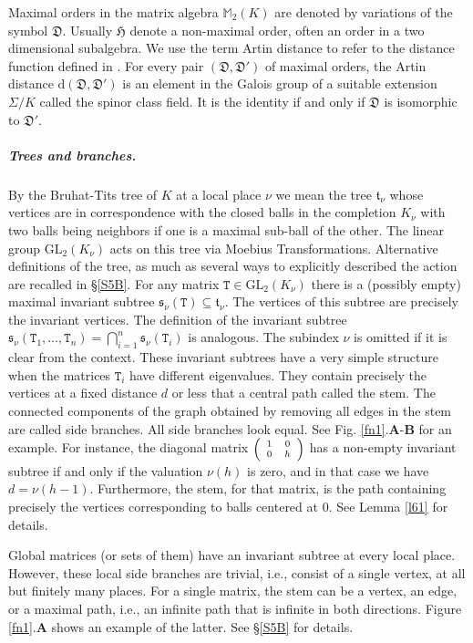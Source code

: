 \documentclass{article}
\theoremstyle{definition}
\theoremstyle{remark}
\newcommand\sbmattrix[4]{\textnormal{\scriptsize$\left(\begin{array}{cc}#1&#2\\#3&#4\end{array}\right)$\normalsize}}
\begin{document}
Maximal orders in the matrix algebra $\mathbb{M}_2(K)$ 
are denoted by variations of the symbol
$\mathfrak{D}$. Usually $\mathfrak{H}$ denote a non-maximal
order, often an order in a two dimensional subalgebra.
We use the term Artin distance to refer to the distance function defined in \cite[\S1]{A13}. For every pair 
$(\mathfrak{D},\mathfrak{D}')$ of maximal orders,
the Artin distance $\mathrm{d}(\mathfrak{D},\mathfrak{D}')$ 
is an element in the Galois group of a suitable extension $\Sigma/K$ called the spinor class field. It is the identity
if and only if $\mathfrak{D}$ is isomorphic to $\mathfrak{D}'$.

\subparagraph{Trees and branches.}

By the Bruhat-Tits tree of $K$ at a local place $\nu$ we 
mean the
tree $\mathfrak{t}_\nu$ whose vertices are in 
correspondence with
the closed balls in the completion $K_\nu$ with two balls 
being neighbors if one is a maximal sub-ball of the other. The 
linear group  $\mathrm{GL}_2(K_\nu)$ acts on this 
tree via Moebius
Transformations. Alternative definitions of the tree,
as much as several ways to explicitly described the action
are recalled in \S\ref{S5B}. For any matrix $\mathtt{T}\in
\mathrm{GL}_2(K_\nu)$ there is a (possibly empty) maximal
invariant subtree 
$\mathfrak{s}_\nu(\mathtt{T})\subseteq\mathfrak{t}_\nu$.
The vertices of this subtree are precisely the 
invariant vertices.
The definition of the invariant subtree 
$\mathfrak{s}_\nu(\mathtt{T}_1,\dots,\mathtt{T}_n)=
\bigcap_{i=1}^n\mathfrak{s}_\nu(\mathtt{T}_i)$ is analogous. 
The subindex $\nu$ is omitted if it is clear from the context. 
These invariant subtrees have a very simple structure 
when the matrices $\mathtt{T}_i$ have different eigenvalues. 
They contain
precisely the vertices at a fixed distance $d$ or 
less that a central 
path called the stem. The connected 
components of the graph obtained 
by removing all edges in the stem are called side branches. All side branches look equal.
See Fig. \ref{fn1}.\textbf{A}-\textbf{B} for an example.
For instance, the diagonal matrix $\sbmattrix100h$
has a non-empty invariant subtree if and only if the valuation 
$\nu(h)$ is zero, and in that case we have $d=\nu(h-1)$.
Furthermore, the stem, for that matrix, is the path containing
precisely the vertices corresponding to balls centered at $0$.
See Lemma \ref{l61} for details.

Global matrices (or sets of them) have an invariant subtree
at every local place. However, these local side branches 
are trivial, i.e.,
consist of a single vertex, at all but finitely many places.
For a single matrix, the stem can be a vertex, an edge,
or a maximal path, i.e., an infinite path that is infinite
in both directions. Figure \ref{fn1}.\textbf{A} shows an
example of the latter. See \S\ref{S5B} for details.
\end{document}
